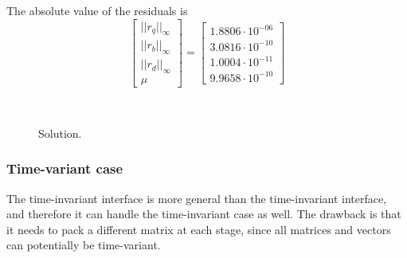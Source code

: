 \documentclass[a4paper]{report}
\begin{document}
The absolute value of the residuals is
\begin{equation*}
\begin{bmatrix} ||r_q||_\infty \\ ||r_b||_\infty \\ ||r_d||_\infty \\ \mu \end{bmatrix} = \begin{bmatrix} 1.8806\cdot 10^{-06} \\ 3.0816\cdot 10^{-10} \\ 1.0004\cdot 10^{-11} \\ 9.9658\cdot 10^{-10} \end{bmatrix}
\end{equation*}

\begin{figure}%
\centering
{} %
 \\
\caption{Solution.}
\label{fig:sol}
\end{figure}


\subsubsection{Time-variant case}

The time-invariant interface is more general than the time-invariant interface, and therefore it can handle the time-invariant case as well.
The drawback is that it needs to pack a different matrix at each stage, since all matrices and vectors can potentially be time-variant.
\end{document}
